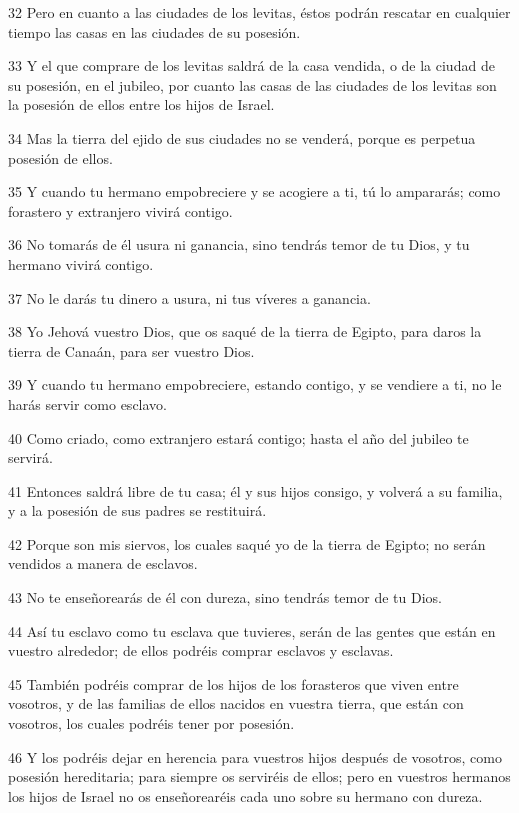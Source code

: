 \par 32 Pero en cuanto a las ciudades de los levitas, éstos podrán rescatar en cualquier tiempo las casas en las ciudades de su posesión.
\par 33 Y el que comprare de los levitas saldrá de la casa vendida, o de la ciudad de su posesión, en el jubileo, por cuanto las casas de las ciudades de los levitas son la posesión de ellos entre los hijos de Israel.
\par 34 Mas la tierra del ejido de sus ciudades no se venderá, porque es perpetua posesión de ellos.
\par 35 Y cuando tu hermano empobreciere y se acogiere a ti, tú lo ampararás; como forastero y extranjero vivirá contigo.
\par 36 No tomarás de él usura ni ganancia, sino tendrás temor de tu Dios, y tu hermano vivirá contigo.
\par 37 No le darás tu dinero a usura, ni tus víveres a ganancia.
\par 38 Yo Jehová vuestro Dios, que os saqué de la tierra de Egipto, para daros la tierra de Canaán, para ser vuestro Dios.
\par 39 Y cuando tu hermano empobreciere, estando contigo, y se vendiere a ti, no le harás servir como esclavo.
\par 40 Como criado, como extranjero estará contigo; hasta el año del jubileo te servirá.
\par 41 Entonces saldrá libre de tu casa; él y sus hijos consigo, y volverá a su familia, y a la posesión de sus padres se restituirá.
\par 42 Porque son mis siervos, los cuales saqué yo de la tierra de Egipto; no serán vendidos a manera de esclavos.
\par 43 No te enseñorearás de él con dureza, sino tendrás temor de tu Dios.
\par 44 Así tu esclavo como tu esclava que tuvieres, serán de las gentes que están en vuestro alrededor; de ellos podréis comprar esclavos y esclavas.
\par 45 También podréis comprar de los hijos de los forasteros que viven entre vosotros, y de las familias de ellos nacidos en vuestra tierra, que están con vosotros, los cuales podréis tener por posesión.
\par 46 Y los podréis dejar en herencia para vuestros hijos después de vosotros, como posesión hereditaria; para siempre os serviréis de ellos; pero en vuestros hermanos los hijos de Israel no os enseñorearéis cada uno sobre su hermano con dureza.
